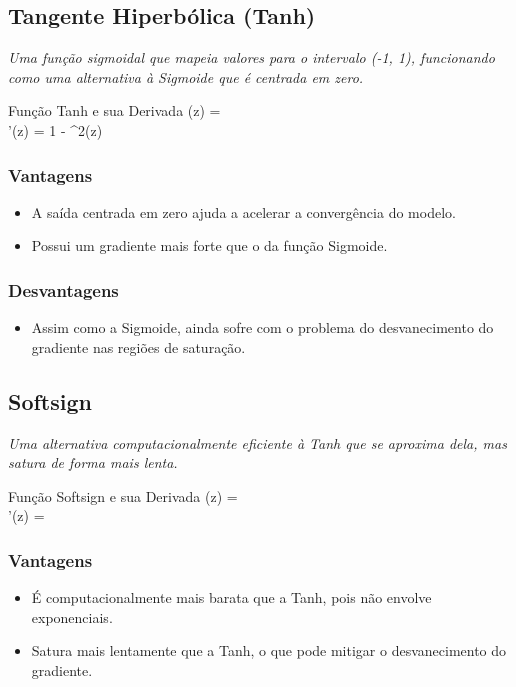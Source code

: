 \subsection{Tangente Hiperbólica (Tanh)}

\textit{Uma função sigmoidal que mapeia valores para o intervalo (-1, 1), funcionando como uma alternativa à Sigmoide que é centrada em zero.}

\begin{equacaodestaque}{Função Tanh e sua Derivada}
    \tanh(z) =  \\
    \tanh'(z) = 1 - \tanh^2(z)
\end{equacaodestaque}

\subsubsection*{Vantagens}
\begin{itemize}
    \item A saída centrada em zero ajuda a acelerar a convergência do modelo.
    \item Possui um gradiente mais forte que o da função Sigmoide.
\end{itemize}

\subsubsection*{Desvantagens}
\begin{itemize}
    \item Assim como a Sigmoide, ainda sofre com o problema do desvanecimento do gradiente nas regiões de saturação.
\end{itemize}

\subsection{Softsign}
\textit{Uma alternativa computacionalmente eficiente à Tanh que se aproxima dela, mas satura de forma mais lenta.}
\begin{equacaodestaque}{Função Softsign e sua Derivada}
    (z) =  \\
    '(z) = 
\end{equacaodestaque}
\subsubsection*{Vantagens}
\begin{itemize}
    \item É computacionalmente mais barata que a Tanh, pois não envolve exponenciais.
    \item Satura mais lentamente que a Tanh, o que pode mitigar o desvanecimento do gradiente.
\end{itemize}
